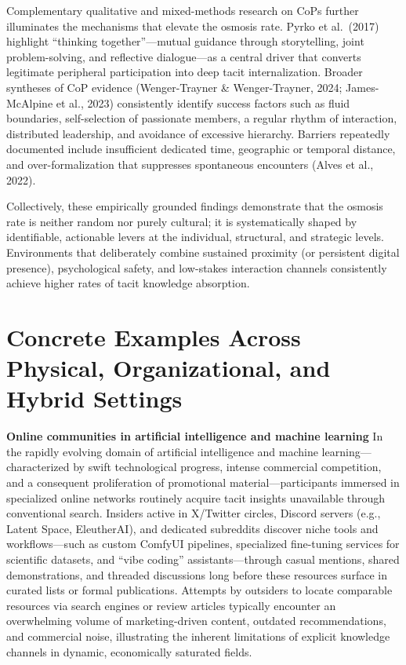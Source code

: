 \documentclass[11pt,a4paper]{article}
\begin{document}
Complementary qualitative and mixed-methods research on CoPs further illuminates the mechanisms that elevate the osmosis rate. Pyrko et al.\ (2017) highlight ``thinking together''---mutual guidance through storytelling, joint problem-solving, and reflective dialogue---as a central driver that converts legitimate peripheral participation into deep tacit internalization. Broader syntheses of CoP evidence (Wenger-Trayner \& Wenger-Trayner, 2024; James-McAlpine et al., 2023) consistently identify success factors such as fluid boundaries, self-selection of passionate members, a regular rhythm of interaction, distributed leadership, and avoidance of excessive hierarchy. Barriers repeatedly documented include insufficient dedicated time, geographic or temporal distance, and over-formalization that suppresses spontaneous encounters (Alves et al., 2022).

Collectively, these empirically grounded findings demonstrate that the osmosis rate is neither random nor purely cultural; it is systematically shaped by identifiable, actionable levers at the individual, structural, and strategic levels. Environments that deliberately combine sustained proximity (or persistent digital presence), psychological safety, and low-stakes interaction channels consistently achieve higher rates of tacit knowledge absorption.

\section{Concrete Examples Across Physical, Organizational, and Hybrid Settings}
\textbf{Online communities in artificial intelligence and machine learning}  
In the rapidly evolving domain of artificial intelligence and machine learning---characterized by swift technological progress, intense commercial competition, and a consequent proliferation of promotional material---participants immersed in specialized online networks routinely acquire tacit insights unavailable through conventional search. Insiders active in X/Twitter circles, Discord servers (e.g., Latent Space, EleutherAI), and dedicated subreddits discover niche tools and workflows---such as custom ComfyUI pipelines, specialized fine-tuning services for scientific datasets, and ``vibe coding'' assistants---through casual mentions, shared demonstrations, and threaded discussions long before these resources surface in curated lists or formal publications. Attempts by outsiders to locate comparable resources via search engines or review articles typically encounter an overwhelming volume of marketing-driven content, outdated recommendations, and commercial noise, illustrating the inherent limitations of explicit knowledge channels in dynamic, economically saturated fields.
\end{document}

